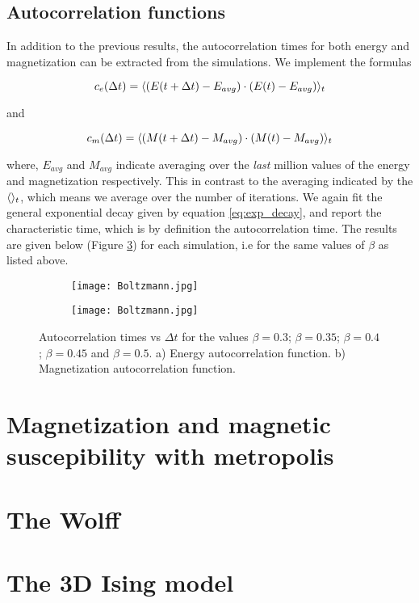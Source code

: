 \documentclass[11pt,a4paper]{article}
\DeclarePairedDelimiter{\avg}{\langle}{\rangle}
\begin{document}
\subsection{Autocorrelation functions}
In addition to the previous results, the autocorrelation times for both energy and magnetization can be
 extracted from the simulations. We implement the formulas

\begin{equation*}
    c_e(\Delta t) = \avg{(E(t+\Delta t) - E_{avg})\cdot (E(t)-E_{avg})}_t
\end{equation*}

and

\begin{equation*}
    c_m(\Delta t) = \avg{(M(t+\Delta t) - M_{avg})\cdot (M(t)-M_{avg})}_t
\end{equation*}


where, $E_{avg}$ and $M_{avg}$ indicate averaging over the \textit{last} million values of the energy and magnetization
 respectively. This in contrast to the averaging indicated by the $\avg{}_t$, which means we average over the number of
 iterations. We again fit the general exponential decay given by equation \ref{eq:exp_decay}, and report the characteristic
 time, which is by definition the autocorrelation time. The results are given below (Figure \ref{fig:autocorr})
 for each simulation, i.e for the same values of $\beta$ as listed above.
 
\begin{figure}[h!]
\centering
\begin{subfigure}{.5\textwidth}
  \centering
  \texttt{[image: Boltzmann.jpg]}
  \caption{}
  \label{fig:autocorr_energy}
\end{subfigure}%
\begin{subfigure}{.5\textwidth}
  \centering
  \texttt{[image: Boltzmann.jpg]}
  \caption{}
  \label{fig:autocorr_mag}
\end{subfigure}
\caption{Autocorrelation times vs $\Delta t$ for the values $\beta = 0.3$; $\beta = 0.35$;
         $\beta = 0.4$; $\beta = 0.45$ and $\beta = 0.5$. a) Energy autocorrelation function. 
         b) Magnetization autocorrelation function.}
\label{fig:autocorr}
\end{figure}


\section{Magnetization and magnetic suscepibility with metropolis}

\section{The Wolff}

\section{The 3D Ising model}
\end{document}
